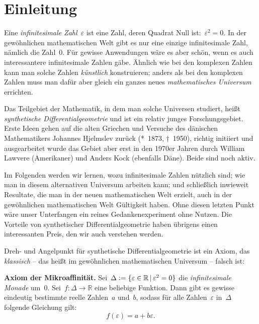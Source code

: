 \documentclass[twoside]{../zirkelblatt}
\newcommand{\RR}{\mathbb{R}}
\newcommand{\defeq}{\vcentcolon=}
\theoremstyle{definition}
\theoremstyle{plain}
\theoremstyle{remark}
\begin{document}

{\renewcommand{\addvspace}[1]{\vskip0.6em}
\tableofcontents%
}

\section{Einleitung}

Eine \emph{infinitesimale Zahl}~$\varepsilon$ ist eine Zahl, deren Quadrat Null
ist:~$\varepsilon^2 = 0$. In der gewöhnlichen mathematischen Welt gibt es nur
eine einzige infinitesimale Zahl, nämlich die Zahl~$0$. Für gewisse Anwendungen wäre es
aber schön, wenn es auch interessantere infinitesimale Zahlen gäbe. Ähnlich wie
bei den komplexen Zahlen kann man solche Zahlen \emph{künstlich} konstruieren;
anders als bei den komplexen Zahlen muss man dafür aber gleich ein ganzes neues
\emph{mathematisches Universum} errichten.

Das Teilgebiet der Mathematik, in dem man solche Universen studiert, heißt
\emph{synthetische Differentialgeometrie} und ist ein relativ junges
Forschungsgebiet. Erste Ideen gehen auf die alten Griechen und Versuche des
dänischen Mathematikers Johannes Hjelmslev zurück (*~1873, †~1950), richtig
initiiert und ausgearbeitet wurde das Gebiet aber erst in den 1970er Jahren
durch William Lawvere (Amerikaner) und Anders Kock (ebenfalls Däne). Beide sind
noch aktiv.

Im Folgenden werden wir lernen, wozu infinitesimale Zahlen nützlich sind; wie
man in diesem alternativen Universum arbeiten kann; und schließlich inwieweit
Resultate, die man in der neuen mathematischen Welt erzielt, auch in der
gewöhnlichen mathematischen Welt Gültigkeit haben. Ohne diesen letzten Punkt
wäre unser Unterfangen ein reines Gedankenexperiment ohne Nutzen. Die Vorteile
von synthetischer Differentialgeometrie haben übrigens einen interessanten
Preis, den wir auch verstehen werden.

Dreh- und Angelpunkt für synthetische Differentialgeometrie ist ein Axiom,
das \emph{klassisch} -- das heißt im gewöhnlichen mathematischen Universum --
falsch ist:

\newcommand{\axiommikro}{
  \begin{shaded}
  \textbf{Axiom der Mikroaffinität.}
  Sei~$\Delta \defeq \{ \varepsilon \in \RR \,|\, \varepsilon^2 = 0 \}$ die
  \emph{infinitesimale Monade} um~$0$. Sei~$f : \Delta \to \RR$ eine beliebige
  Funktion. Dann gibt es gewisse eindeutig bestimmte reelle Zahlen~$a$ und~$b$,
  sodass für alle Zahlen~$\varepsilon$ in~$\Delta$ folgende Gleichung gilt:
  \[ f(\varepsilon) = a + b \varepsilon. \]
  \vspace{-1.5em}%
  \end{shaded}
}
\axiommikro
\end{document}

